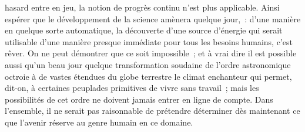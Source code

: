 \documentclass[french,twoside]{book} %
\begin{document}
hasard entre en jeu, la notion de progrès continu n'est plus applicable. Ainsi espérer que le développement de la science amènera quelque jour, : d'une manière en quelque sorte automatique, la découverte d'une source d'énergie qui serait utilisable d'une manière presque immédiate pour tous les besoins humains, c'est rêver. On ne peut démontrer que ce soit impossible ; et à vrai dire il est possible aussi qu'un beau jour quelque transformation soudaine de l'ordre astronomique octroie à de vastes étendues du globe terrestre le climat enchanteur qui permet, dit-on, à certaines peuplades primitives de vivre sans travail ; mais les possibilités de cet ordre ne doivent jamais entrer en ligne de compte. Dans l'ensemble, il ne serait pas raisonnable de prétendre déterminer dès maintenant ce que l'avenir réserve au genre humain en ce domaine.\par
\end{document}

